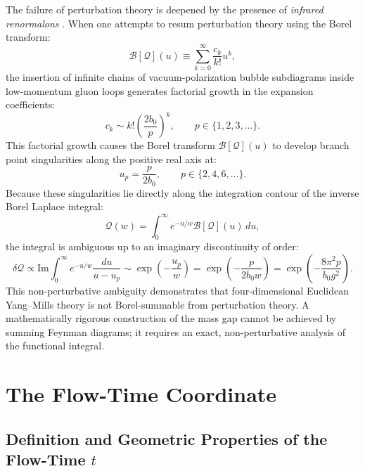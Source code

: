 The failure of perturbation theory is deepened by the presence of \emph{infrared renormalons} \cite{tHooft1979}. When one attempts to resum perturbation theory using the Borel transform:
\begin{equation}
\label{eq:borel_transform}
\mathcal{B}[\mathcal{Q}](u) \equiv \sum_{k=0}^\infty \frac{c_k}{k!} u^k,
\end{equation}
the insertion of infinite chains of vacuum-polarization bubble subdiagrams inside low-momentum gluon loops generates factorial growth in the expansion coefficients:
\begin{equation}
\label{eq:renormalon_factorial}
c_k \sim k! \left( \frac{2 b_0}{p} \right)^k, \qquad p \in \{1, 2, 3, \dots\}.
\end{equation}
This factorial growth causes the Borel transform $\mathcal{B}[\mathcal{Q}](u)$ to develop branch point singularities along the positive real axis at:
\begin{equation}
\label{eq:renormalon_poles}
u_p = \frac{p}{2 b_0}, \qquad p \in \{2, 4, 6, \dots\}.
\end{equation}
Because these singularities lie directly along the integration contour of the inverse Borel Laplace integral:
\begin{equation}
\label{eq:borel_laplace}
\mathcal{Q}(w) = \int_0^\infty e^{-u / w} \mathcal{B}[\mathcal{Q}](u) \, du,
\end{equation}
the integral is ambiguous up to an imaginary discontinuity of order:
\begin{equation}
\label{eq:borel_ambiguity}
\delta \mathcal{Q} \propto \mathrm{Im} \int_0^\infty e^{-u / w} \frac{du}{u - u_p} \sim \exp\left( -\frac{u_p}{w} \right) = \exp\left( -\frac{p}{2 b_0 w} \right) = \exp\left( -\frac{8\pi^2 p}{b_0 g^2} \right).
\end{equation}
This non-perturbative ambiguity demonstrates that four-dimensional Euclidean Yang--Mills theory is not Borel-summable from perturbation theory. A mathematically rigorous construction of the mass gap cannot be achieved by summing Feynman diagrams; it requires an exact, non-perturbative analysis of the functional integral.

\section{The Flow-Time Coordinate}
\label{sec:flow_time_coordinate}

\subsection{Definition and Geometric Properties of the Flow-Time $t$}
\label{subsec:flow_time_def}

